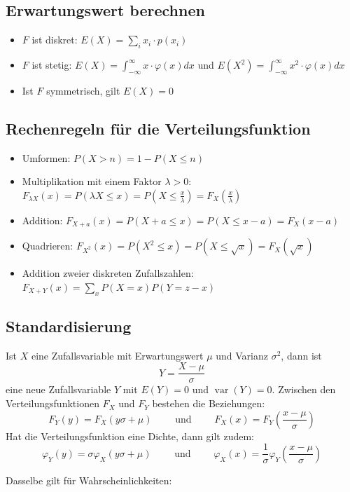 \subsection{Erwartungswert berechnen}
\begin{itemize}
  \item $F$ ist diskret: $E(X) = \sum_i x_i \cdot p(x_i)$ %
  \item $F$ ist stetig: $E(X) = \int_{-\infty}^{\infty}x \cdot \varphi(x)dx$
    und $E(X^2) = \int_{-\infty}^{\infty}x^2 \cdot \varphi(x)dx$
  \item Ist $F$ symmetrisch, gilt $E(X) = 0$
\end{itemize}

\subsection{Rechenregeln für die Verteilungsfunktion}
\begin{itemize}
  \item Umformen: $P(X>n) = 1 - P(X \le n)$
  \item Multiplikation mit einem Faktor $\lambda > 0$: $F_{\lambda X}(x)=
    P(\lambda X \le x) = P(X \le \frac{x}{\lambda}) =
    F_X(\frac{x}{\lambda})$
  \item Addition: $F_{X+a}(x) = P(X+a \le x) = P(X \le x-a) = F_X(x-a)$
  \item Quadrieren: $F_{X^2}(x) = P(X^2 \le x) = P(X \le \sqrt{x}) =
    F_X(\sqrt{x})$
  \item Addition zweier diskreten Zufallszahlen:
    $F_{X+Y}(x) = \sum_x P(X=x)P(Y=z-x)$
\end{itemize}

\subsection{Standardisierung}
Ist $X$ eine Zufallsvariable mit Erwartungswert $\mu$ und Varianz
$\sigma^2$, dann ist
\[ Y = \frac{X-\mu}{\sigma} \]
eine neue Zufallsvariable $Y$ mit $E(Y) = 0$ und $\operatorname{var}(Y) = 0$.
Zwischen den Verteilungsfunktionen $F_X$ und $F_Y$ bestehen die
Beziehungen:
\[ F_Y(y) = F_X(y\sigma+\mu) \qquad \text{ und } \qquad
  F_X(x)=F_Y\left(\frac{x-\mu}{\sigma}\right) \]
Hat die Verteilungsfunktion eine Dichte, dann gilt zudem:
\[ \varphi_Y(y) = \sigma \varphi_X(y\sigma+\mu) \qquad \text{ und }
  \qquad \varphi_X(x) = \frac{1}{\sigma}
  \varphi_Y\left(\frac{x-\mu}\sigma\right) \]

Dasselbe gilt für Wahrscheinlichkeiten:

